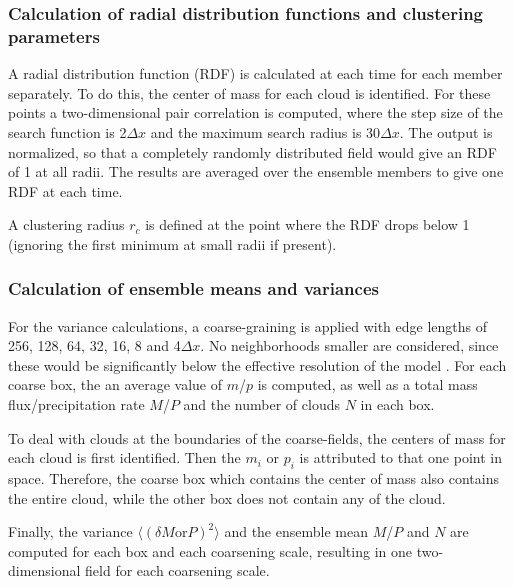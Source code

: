 \documentclass[a4paper, 12pt]{article}
\begin{document}
\subsubsection{Calculation of radial distribution functions and clustering parameters}
A radial distribution function (RDF) is calculated at each time for each member separately. To do this, the center of mass for each cloud is identified. For these points a two-dimensional pair correlation is computed, where the step size of the search function is 2$\Delta x$ and the maximum search radius is 30$\Delta x$. The output is normalized, so that a completely randomly distributed field would give an RDF of 1 at all radii. The results are averaged over the ensemble members to give one RDF at each time. 

A clustering radius $r_c$ is defined at the point where the RDF drops below 1 (ignoring the first minimum at small radii if present). 

\subsubsection{Calculation of ensemble means and variances}
For the variance calculations, a coarse-graining is applied with edge lengths of 256, 128, 64, 32, 16, 8 and 4$\Delta x$. No neighborhoods smaller are considered, since these would be significantly below the effective resolution of the model \citep{Bierdel2012}. For each coarse box, the an average value of $m$/$p$ is computed, as well as a total mass flux/precipitation rate $M$/$P$ and the number of clouds $N$ in each box.

To deal with clouds at the boundaries of the coarse-fields, the centers of mass for each cloud is first identified. Then the $m_i$ or $p_i$ is attributed to that one point in space. Therefore, the coarse box which contains the center of mass also contains the entire cloud, while the other box does not contain any of the cloud. 

Finally, the variance $\langle (\delta M \mathrm{or} P)^2 \rangle$ and the ensemble mean $M$/$P$ and $N$ are computed for each box and each coarsening scale, resulting in one two-dimensional field for each coarsening scale. 
\end{document}
